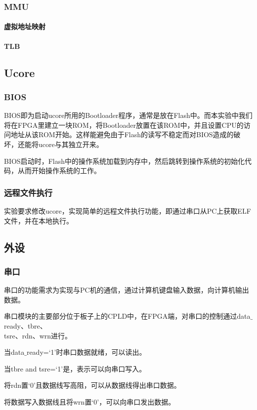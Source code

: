 \subsubsection{MMU}
\paragraph{虚拟地址映射}
\paragraph{TLB}

\subsection{Ucore}
\subsubsection{BIOS}
BIOS即为启动ucore所用的Bootloader程序，通常是放在Flash中。而本实验中我们将在FPGA里建立一块ROM，将Bootloader放置在该ROM中，并且设置CPU的访问地址从该ROM开始。这样能避免由于Flash的读写不稳定而对BIOS造成的破坏，还能将ucore与其独立开来。

BIOS启动时，Flash中的操作系统加载到内存中，然后跳转到操作系统的初始化代码，从而开始操作系统的工作。
\subsubsection{远程文件执行}
实验要求修改ucore，实现简单的远程文件执行功能，即通过串口从PC上获取ELF文件，并在本地执行。
\subsection{外设}
\subsubsection{串口}
串口的功能需求为实现与PC机的通信，通过计算机键盘输入数据，向计算机输出数据。

串口模块的主要部分位于板子上的CPLD中，在FPGA端，对串口的控制通过data$\_$ready、tbre、\\
tsre、rdn、wrn进行。

当data$\_$ready=‘1’时串口数据就绪，可以读出。

当tbre and tsre=‘1’是，表示可以向串口写入。

将rdn置‘0’且数据线写高阻，可以从数据线得出串口数据。

将数据写入数据线且将wrn置‘0’，可以向串口发出数据。

